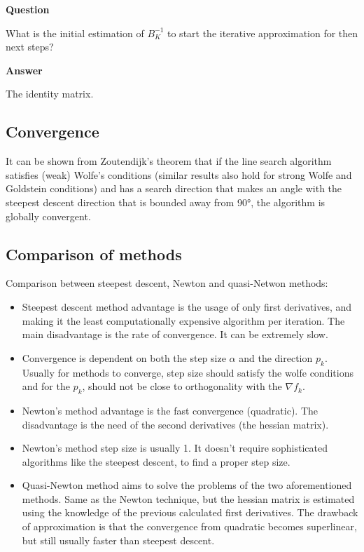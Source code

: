 \documentclass[a4paper,11pt]{article}
\numberwithin{equation}{section} %
\begin{document}
\textbf{Question}

What is the initial estimation of $B_K^{-1}$ to start the iterative approximation for then next steps?

\textbf{Answer}

The identity matrix.

\subsection{Convergence}

It can be shown from Zoutendijk's theorem that if the line search algorithm satisfies (weak) Wolfe's conditions (similar results also hold for strong Wolfe and Goldstein conditions) and has a search direction that makes an angle with the steepest descent direction that is bounded away from 90°, the algorithm is globally convergent. 

\subsection{Comparison of methods}

Comparison between steepest descent, Newton and quasi-Netwon methods:

\begin{itemize}
    \item Steepest descent method advantage is the usage of only first derivatives, and making it the least computationally expensive algorithm per iteration. The main disadvantage is the rate of convergence. It can be extremely slow.

    \item Convergence is dependent on both the step size $\alpha$ and the direction $p_k$. Usually for methods to converge, step size should satisfy the wolfe conditions and for the $p_k$, should not be close to orthogonality with the $\nabla f_k$.
    
    \item Newton's method advantage is the fast convergence (quadratic). The disadvantage is the need of the second derivatives (the hessian matrix). 
    
    \item Newton's method step size is usually 1. It doesn't require sophisticated algorithms like the steepest descent, to find a proper step size.
    
    \item Quasi-Newton method aims to solve the problems of the two aforementioned methods. Same as the Newton technique, but the hessian matrix is estimated using the knowledge of the previous calculated first derivatives. The drawback of approximation is that the convergence from quadratic becomes superlinear, but still usually faster than steepest descent.
    
\end{itemize}
\end{document}
